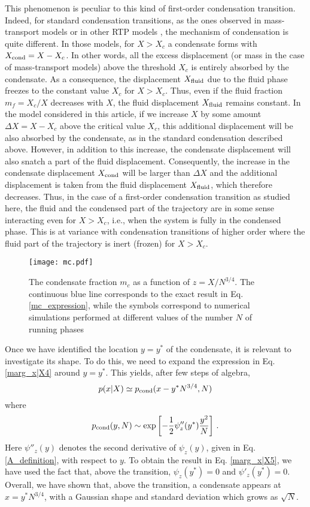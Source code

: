 \documentclass[aps,pre,twocolumn,superscriptaddress,showpacs]{revtex4-1}
\newcommand{\be}{\begin{equation}}
\newcommand{\ee}{\end{equation}}
\begin{document}
This phenomenon is peculiar to this kind of first-order condensation transition. Indeed, for standard condensation transitions, as the ones observed in mass-transport models \cite{MEZ2005,EMZ06} or in other RTP models \cite{MLDM21}, the mechanism of condensation is quite different. In those models, for $X>X_c$ a condensate forms with $X_{\rm cond}=X-X_c$. In other words, all the excess displacement (or mass in the case of mass-transport models) above the threshold $X_c$ is entirely absorbed by the condensate. As a consequence, the displacement $X_{\rm fluid}$ due to the fluid phase freezes to the constant value $X_c$ for $X>X_c$. Thus, even if the fluid fraction $m_f=X_c/X$ decreases with $X$, the fluid displacement $X_{\rm fluid}$ remains constant. In the model considered in this article, if we increase $X$ by some amount $\Delta X=X-X_c$ above the critical value $X_c$, this additional displacement will be also absorbed by the condensate, as in the standard condensation described above. However, in addition to this increase, the condensate displacement will also snatch a part of the fluid displacement. Consequently, the increase in the condensate displacement $X_{\rm cond}$ will be larger than $\Delta X$ and the additional displacement is taken from the fluid displacement $X_{\rm fluid}$, which therefore decreases. Thus, in the case of a first-order condensation transition as studied here, the fluid and the condensed part of the trajectory are in some sense interacting even for $X>X_c$, i.e., when the system is fully in the condensed phase. This is at variance with condensation transitions of higher order where the fluid part of the trajectory is inert (frozen) for $X>X_c$.



\begin{figure}
\texttt{[image: mc.pdf]}
\caption{The condensate fraction $m_c$ as a function of $z=X/N^{3/4}$. The continuous blue line corresponds to the exact result in Eq. \eqref{mc_expression}, while the symbols correspond to numerical simulations performed at different values of the number $N$ of running phases}
\label{fig:mc}
\end{figure}

Once we have identified the location $y=y^*$ of the condensate, it is relevant to investigate its shape. To do this, we need to expand the expression in Eq. \eqref{marg_x|X4} around $y=y^*$. This yields, after few steps of algebra,
\be 
p(x|X)\simeq p_{\rm cond}(x-y^* N^{3/4},N)\\
\label{marg_x|X5}
\ee
where
\be
p_{\rm cond}(y,N)\sim \exp\left[-\frac12 \psi''_z(y^*) \frac{y^2}{N}\right]\,.
\ee
Here $\psi''_z(y)$ denotes the second derivative of $\psi_z(y)$, given in Eq. \eqref{A_definition}, with respect to $y$. To obtain the result in Eq. \eqref{marg_x|X5}, we have used the fact that, above the transition, $\psi_z(y^*)=0$ and $\psi'_z(y^*)=0$. Overall, we have shown that, above the transition, a condensate appears at $x=y^* N^{3/4}$, with a Gaussian shape and standard deviation which grows as $\sqrt{N}$.
\end{document}
